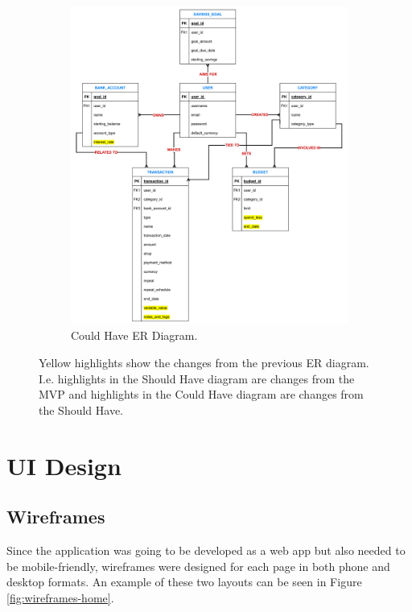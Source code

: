 \documentclass{l4proj}
\begin{document}
\begin{figure}[htb]
\begin{subfigure}[b]{0.45\textwidth}
        \includegraphics[width=\textwidth]{images/ER-Diagrams/final_could_have_ER.png} 
        \caption{Could Have ER Diagram.}
        \label{fig:syn2}
    \end{subfigure}   
    \caption{Yellow highlights show the changes from the previous ER diagram. I.e. highlights in the Should Have diagram are changes from the MVP and highlights in the Could Have diagram are changes from the Should Have.
    }\label{fig:non-mvp-er-diagrams}
\end{figure}
\newpage


\section{UI Design}
\subsection{Wireframes}
Since the application was going to be developed as a web app but also needed to be mobile-friendly, wireframes were designed for each page in both phone and desktop formats. An example of these two layouts can be seen in Figure \ref{fig:wireframes-home}.
\end{document}

